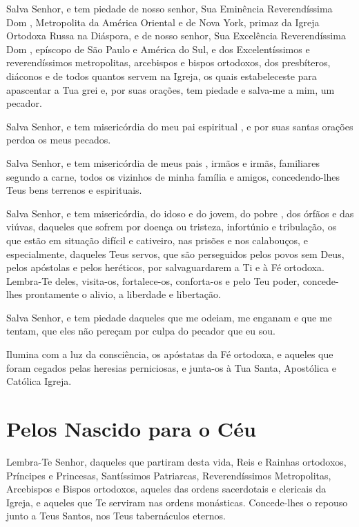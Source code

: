 \documentclass{subfiles}
\begin{document}
Salva Senhor, e tem piedade de nosso senhor, Sua Eminência Reverendíssima Dom
\name, Metropolita da América Oriental e de Nova York, primaz da Igreja
Ortodoxa Russa na Diáspora, e de nosso senhor, Sua Excelência Reverendíssima Dom
\name, epíscopo de São Paulo e América do Sul, e dos Excelentíssimos e
reverendíssimos metropolitas, arcebispos e bispos ortodoxos, dos presbíteros,
diáconos e de todos quantos servem na Igreja, os quais estabeleceste para
apascentar a Tua grei e, por suas orações, tem piedade e salva-me a mim, um
pecador. \metanoia{}

Salva Senhor, e tem misericórdia do meu pai espiritual \name, e por
suas santas orações perdoa os meus pecados. \metanoia{}

Salva Senhor, e tem misericórdia de meus pais \names, irmãos e irmãs,
familiares segundo a carne, todos os vizinhos de minha família e amigos,
concedendo-lhes Teus bens terrenos e espirituais. \metanoia{}

Salva Senhor, e tem misericórdia, do idoso e do jovem, do pobre , dos órfãos e
das viúvas, daqueles que sofrem por doença ou tristeza, infortúnio e tribulação,
os que estão em situação difícil e cativeiro, nas prisões e nos calabouços, e
especialmente, daqueles Teus servos, que são perseguidos pelos povos sem Deus,
pelos apóstolas e pelos heréticos, por salvaguardarem a Ti e à Fé ortodoxa.
Lembra-Te deles, visita-os, fortalece-os, conforta-os e pelo Teu poder,
concede-lhes prontamente o alivio, a liberdade e libertação. \metanoia{}

Salva Senhor, e tem piedade daqueles que me odeiam, me enganam e que me tentam,
que eles não pereçam por culpa do pecador que eu sou. \metanoia{}

Ilumina com a luz da consciência, os apóstatas da Fé ortodoxa, e aqueles que
foram cegados pelas heresias perniciosas, e junta-os à Tua Santa, Apostólica e
Católica Igreja. \metanoia{}

\section*{Pelos Nascido para o Céu}

Lembra-Te Senhor, daqueles que partiram desta vida, Reis e Rainhas ortodoxos,
Príncipes e Princesas, Santíssimos Patriarcas, Reverendíssimos Metropolitas,
Arcebispos e Bispos ortodoxos, aqueles das ordens sacerdotais e clericais da
Igreja, e aqueles que Te serviram nas ordens monásticas. Concede-lhes o repouso
junto a Teus Santos, nos Teus tabernáculos eternos. \metanoia{}
\end{document}
